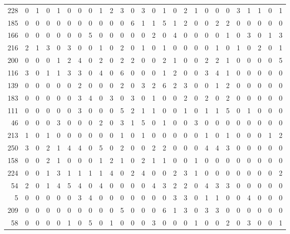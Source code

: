 \begin{longtable}{@{\extracolsep{\fill}}rccccccccccccccccccccccccc@{}}
228 & 0 & 1 & 0 & 1 & 0 & 0 & 0 & 1 & 2 & 3 & 0 & 3 & 0 & 1 & 0 & 2 & 1 & 0 & 0 & 0 & 3 & 1 & 1 & 0 & 1 \\
185 & 0 & 0 & 0 & 0 & 0 & 0 & 0 & 0 & 0 & 0 & 6 & 1 & 1 & 5 & 1 & 2 & 0 & 0 & 2 & 2 & 0 & 0 & 0 & 0 & 0 \\
166 & 0 & 0 & 0 & 0 & 0 & 0 & 5 & 0 & 0 & 0 & 0 & 0 & 2 & 0 & 4 & 0 & 0 & 0 & 0 & 1 & 0 & 3 & 0 & 1 & 3 \\
216 & 2 & 1 & 3 & 0 & 3 & 0 & 0 & 1 & 0 & 2 & 0 & 1 & 0 & 1 & 0 & 0 & 0 & 0 & 1 & 0 & 1 & 0 & 2 & 0 & 1 \\
200 & 0 & 0 & 0 & 1 & 2 & 4 & 0 & 2 & 0 & 2 & 2 & 0 & 0 & 2 & 1 & 0 & 0 & 2 & 2 & 1 & 0 & 0 & 0 & 0 & 5 \\
116 & 3 & 0 & 1 & 1 & 3 & 3 & 0 & 4 & 0 & 6 & 0 & 0 & 0 & 1 & 2 & 0 & 0 & 3 & 4 & 1 & 0 & 0 & 0 & 0 & 0 \\
139 & 0 & 0 & 0 & 0 & 0 & 2 & 0 & 0 & 0 & 2 & 0 & 3 & 2 & 6 & 2 & 3 & 0 & 0 & 1 & 2 & 0 & 0 & 0 & 0 & 0 \\
183 & 0 & 0 & 0 & 0 & 0 & 3 & 4 & 0 & 3 & 0 & 3 & 0 & 1 & 0 & 0 & 2 & 0 & 2 & 0 & 2 & 0 & 0 & 0 & 0 & 0 \\
111 & 0 & 0 & 0 & 0 & 0 & 3 & 0 & 0 & 0 & 5 & 2 & 1 & 1 & 0 & 0 & 1 & 0 & 1 & 1 & 5 & 0 & 1 & 0 & 0 & 0 \\
46 & 0 & 0 & 0 & 3 & 0 & 0 & 0 & 2 & 0 & 3 & 1 & 5 & 0 & 1 & 0 & 0 & 3 & 0 & 0 & 0 & 0 & 0 & 0 & 0 & 0 \\
213 & 1 & 0 & 1 & 0 & 0 & 0 & 0 & 0 & 0 & 1 & 0 & 1 & 0 & 0 & 0 & 0 & 0 & 1 & 0 & 1 & 0 & 0 & 0 & 1 & 2 \\
250 & 3 & 0 & 2 & 1 & 4 & 4 & 0 & 5 & 0 & 2 & 0 & 0 & 2 & 2 & 0 & 0 & 0 & 4 & 4 & 3 & 0 & 0 & 0 & 0 & 0 \\
158 & 0 & 0 & 2 & 1 & 0 & 0 & 0 & 1 & 2 & 1 & 0 & 2 & 1 & 1 & 0 & 0 & 1 & 0 & 0 & 0 & 0 & 0 & 0 & 0 & 0 \\
224 & 0 & 0 & 1 & 3 & 1 & 1 & 1 & 1 & 4 & 0 & 2 & 4 & 0 & 0 & 2 & 3 & 1 & 0 & 0 & 0 & 0 & 0 & 0 & 0 & 2 \\
54 & 2 & 0 & 1 & 4 & 5 & 4 & 0 & 4 & 0 & 0 & 0 & 0 & 4 & 3 & 2 & 2 & 0 & 4 & 3 & 3 & 0 & 0 & 0 & 0 & 0 \\
5 & 0 & 0 & 0 & 0 & 0 & 3 & 4 & 0 & 0 & 0 & 0 & 0 & 0 & 0 & 3 & 3 & 0 & 1 & 1 & 0 & 0 & 4 & 0 & 0 & 0 \\
209 & 0 & 0 & 0 & 0 & 0 & 0 & 0 & 0 & 0 & 5 & 0 & 0 & 0 & 6 & 1 & 3 & 0 & 3 & 3 & 0 & 0 & 0 & 0 & 0 & 0 \\
58 & 0 & 0 & 0 & 0 & 1 & 0 & 5 & 0 & 1 & 0 & 0 & 0 & 3 & 0 & 0 & 0 & 1 & 0 & 0 & 2 & 0 & 3 & 0 & 0 & 1 \\

\end{longtable}
